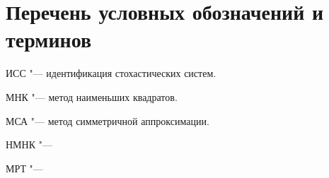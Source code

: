 \chapter*{Перечень условных обозначений и терминов}

ИСС "--- идентификация стохастических систем.

МНК "--- метод наименьших квадратов.

МСА "--- метод симметричной аппроксимации.

НМНК "---

МРТ "---


